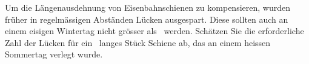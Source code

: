 Um die Längenausdehnung von Eisenbahnschienen zu kompensieren, wurden früher in regelmässigen Abständen Lücken ausgespart. Diese sollten auch an einem eisigen Wintertag nicht grösser als \bLuO\ werden. Schätzen Sie die erforderliche Zahl der Lücken für ein \lScO\ langes Stück Schiene ab, das an einem heissen Sommertag verlegt wurde.
